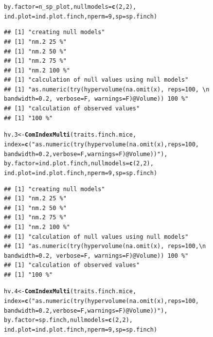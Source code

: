 \documentclass[12pt]{article}\usepackage[]{graphicx}\usepackage[]{color}
\makeatletter
\newcommand{\hlnum}[1]{\textcolor[rgb]{0.686,0.059,0.569}{#1}}%
\newcommand{\hlstr}[1]{\textcolor[rgb]{0.192,0.494,0.8}{#1}}%
\newcommand{\hlstd}[1]{\textcolor[rgb]{0.345,0.345,0.345}{#1}}%
\newcommand{\hlkwb}[1]{\textcolor[rgb]{0.69,0.353,0.396}{#1}}%
\newcommand{\hlkwc}[1]{\textcolor[rgb]{0.333,0.667,0.333}{#1}}%
\newcommand{\hlkwd}[1]{\textcolor[rgb]{0.737,0.353,0.396}{\textbf{#1}}}%
\newenvironment{kframe}{%
 \def\at@end@of@kframe{}%
 \ifinner\ifhmode%
  \def\at@end@of@kframe{\end{minipage}}%
  \begin{minipage}{\columnwidth}%
 \fi\fi%
 \def\FrameCommand##1{\hskip\@totalleftmargin \hskip-\fboxsep
 \colorbox{shadecolor}{##1}\hskip-\fboxsep
     \hskip-\linewidth \hskip-\@totalleftmargin \hskip\columnwidth}%
 \MakeFramed {\advance\hsize-\width
   \@totalleftmargin\z@ \linewidth\hsize
   \@setminipage}}%
 {\par\unskip\endMakeFramed%
 \at@end@of@kframe}
\newenvironment{knitrout}{}{} %
\makeatother
\begin{document}
\begin{knitrout}
\begin{kframe}
\begin{alltt}
                          \hlkwc{by.factor}\hlstd{=n_sp_plot,} \hlkwc{nullmodels}\hlstd{=}\hlkwd{c}\hlstd{(}\hlnum{2}\hlstd{,}\hlnum{2}\hlstd{),}
                          \hlkwc{ind.plot}\hlstd{=ind.plot.finch,} \hlkwc{nperm}\hlstd{=}\hlnum{9}\hlstd{,} \hlkwc{sp}\hlstd{=sp.finch)}
\end{alltt}
\begin{verbatim}
## [1] "creating null models"
## [1] "nm.2 25 %"
## [1] "nm.2 50 %"
## [1] "nm.2 75 %"
## [1] "nm.2 100 %"
## [1] "calculation of null values using null models"
## [1] "as.numeric(try(hypervolume(na.omit(x), reps=100, \n                                  bandwidth=0.2, verbose=F, warnings=F)@Volume)) 100 %"
## [1] "calculation of observed values"
## [1] "100 %"
\end{verbatim}
\begin{alltt}
\hlstd{hv.3}\hlkwb{<-}\hlkwd{ComIndexMulti}\hlstd{(traits.finch.mice,}
                          \hlkwc{index}\hlstd{=}\hlkwd{c}\hlstd{(}\hlstr{"as.numeric(try(hypervolume(na.omit(x), reps=100,
                                  bandwidth=0.2, verbose=F, warnings=F)@Volume))"}\hlstd{),}
                          \hlkwc{by.factor}\hlstd{=ind.plot.finch,} \hlkwc{nullmodels}\hlstd{=}\hlkwd{c}\hlstd{(}\hlnum{2}\hlstd{,}\hlnum{2}\hlstd{),}
                          \hlkwc{ind.plot}\hlstd{=ind.plot.finch,} \hlkwc{nperm}\hlstd{=}\hlnum{9}\hlstd{,} \hlkwc{sp}\hlstd{=sp.finch)}
\end{alltt}
\begin{verbatim}
## [1] "creating null models"
## [1] "nm.2 25 %"
## [1] "nm.2 50 %"
## [1] "nm.2 75 %"
## [1] "nm.2 100 %"
## [1] "calculation of null values using null models"
## [1] "as.numeric(try(hypervolume(na.omit(x), reps=100,\n                                  bandwidth=0.2, verbose=F, warnings=F)@Volume)) 100 %"
## [1] "calculation of observed values"
## [1] "100 %"
\end{verbatim}
\begin{alltt}
\hlstd{hv.4}\hlkwb{<-}\hlkwd{ComIndexMulti}\hlstd{(traits.finch.mice,}
                          \hlkwc{index}\hlstd{=}\hlkwd{c}\hlstd{(}\hlstr{"as.numeric(try(hypervolume(na.omit(x), reps=100, 
                                  bandwidth=0.2, verbose=F, warnings=F)@Volume))"}\hlstd{),}
                          \hlkwc{by.factor}\hlstd{=sp.finch,} \hlkwc{nullmodels}\hlstd{=}\hlkwd{c}\hlstd{(}\hlnum{2}\hlstd{,}\hlnum{2}\hlstd{),}
                          \hlkwc{ind.plot}\hlstd{=ind.plot.finch,} \hlkwc{nperm}\hlstd{=}\hlnum{9}\hlstd{,} \hlkwc{sp}\hlstd{=sp.finch)}
\end{alltt}

\end{kframe}
\end{knitrout}
\end{document}
